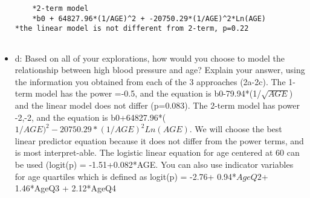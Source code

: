 \documentclass{article}
\begin{document}
\begin{itemize}
\begin{verbatim}
	*2-term model
	*b0 + 64827.96*(1/AGE)^2 + -20750.29*(1/AGE)^2*Ln(AGE)
*the linear model is not different from 2-term, p=0.22
	
     \end{verbatim}
    
    \item d: Based on all of your explorations, how would you choose to model the relationship between high blood pressure and age?  Explain your answer, using the information you obtained from each of the 3 approaches (2a-2c).  
     The 1-term model has the power =-0.5, and the equation is b0-79.94*(1/$\sqrt{AGE}$) and the linear model does not differ (p=0.083).
     The 2-term model has power -2,-2, and the equation is b0+64827.96*($1/AGE)^{2} - 20750.29*(1/AGE)^{2}Ln(AGE)$.  We will choose the best linear predictor equation because it does not differ from the power terms, and is most interpret-able. The logistic linear equation for age centered at 60 can be used (logit(p) = -1.51+0.082*AGE.  You can also use indicator variables for age quartiles which is defined as logit(p) = -2.76+ 0.94*$AgeQ2$+ 1.46*AgeQ3 + 2.12*AgeQ4
    
\end{itemize}
\end{document}
